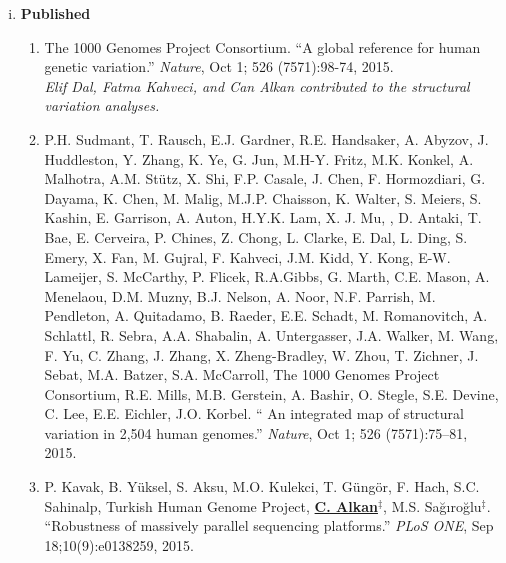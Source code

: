 % 

\begin{enumerate}[i)]
\item {\bf Published} %

\begin{enumerate}

  \item        
    The 1000 Genomes Project Consortium. ``A global reference for human genetic variation.'' {\em Nature}, Oct 1; 526 (7571):98-74, 2015.\\
    {\it Elif Dal, Fatma Kahveci, and Can Alkan contributed to the structural variation analyses.}

  \item        
  P.H. Sudmant, T. Rausch, E.J. Gardner,  R.E. Handsaker, A. Abyzov, J. Huddleston, Y. Zhang, K. Ye, G. Jun, M.H-Y. Fritz, M.K. Konkel, A. Malhotra, A.M. Stütz, X. Shi, F.P. Casale, J. Chen, 
  F. Hormozdiari, G. Dayama, K. Chen, M. Malig, M.J.P. Chaisson, K. Walter, S. Meiers, S. Kashin, E. Garrison, A. Auton, H.Y.K. Lam, X. J. Mu, \calkan, D. Antaki, T. Bae, E. Cerveira, P. Chines, Z. Chong, 
  L. Clarke, E. Dal, L. Ding, S. Emery, X. Fan, M. Gujral, F. Kahveci, J.M. Kidd, Y. Kong, E-W. Lameijer, S. McCarthy, P. Flicek, R.A.Gibbs, G. Marth, C.E. Mason, A. Menelaou, D.M. Muzny, 
  B.J. Nelson, A. Noor, N.F. Parrish, M. Pendleton, A. Quitadamo, B. Raeder, E.E. Schadt, M. Romanovitch, A. Schlattl, R. Sebra, A.A. Shabalin, A. Untergasser, 
  J.A. Walker, M. Wang, F. Yu, C. Zhang, J. Zhang, X. Zheng-Bradley, W. Zhou, T. Zichner, J. Sebat, M.A. Batzer, S.A. McCarroll, 
  The 1000 Genomes Project Consortium, R.E. Mills, M.B. Gerstein, A. Bashir, O. Stegle, S.E. Devine, C. Lee, E.E. Eichler, J.O. Korbel. 
  `` An integrated map of structural variation in 2,504 human genomes.''
  {\em Nature}, Oct 1; 526 (7571):75–81, 2015.

  \item        
   P. Kavak, B. Yüksel, S. Aksu, M.O. Kulekci, T. Güngör, F. Hach, S.C. Sahinalp, Turkish Human Genome Project, {\bf {\underline {C. Alkan}}}$^\ddag$,
  M.S. Sağıroğlu$^\ddag$.    
  ``Robustness of massively parallel sequencing platforms.''
 {\em PLoS ONE},  Sep 18;10(9):e0138259, 2015.  


\end{enumerate}
\end{enumerate}

